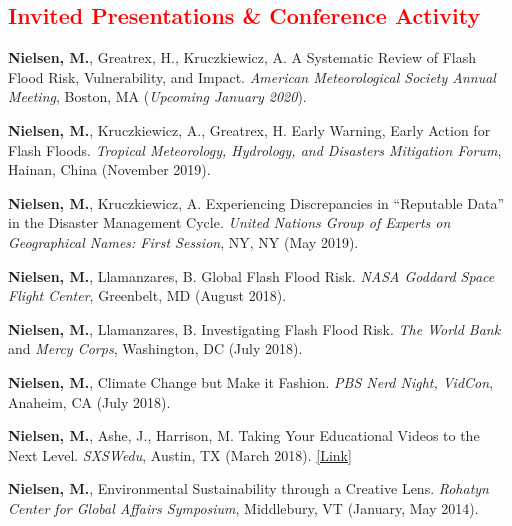 \documentclass[margin, line]{res}
\begin{document}
\begin{resume}
\section{\sc \textcolor{Red}{\large{Invited Presentations \& Conference Activity}}}
\begin{etaremune}[leftmargin=.2in,topsep=0in,parsep=0in]
\item \textbf{Nielsen, M.}, Greatrex, H., Kruczkiewicz, A. A Systematic Review of Flash Flood Risk, Vulnerability, and Impact. \textit{American Meteorological Society Annual Meeting}, Boston, MA (\textit{Upcoming January 2020}).
\item \textbf{Nielsen, M.},  Kruczkiewicz, A., Greatrex, H. Early Warning, Early Action for Flash Floods. \textit{Tropical Meteorology, Hydrology, and Disasters Mitigation Forum}, Hainan, China (November 2019).
\item \textbf{Nielsen, M.}, Kruczkiewicz, A.  Experiencing Discrepancies in “Reputable Data” in the Disaster Management Cycle. \textit{United Nations Group of Experts on Geographical Names: First Session}, NY, NY (May 2019). 
\item  \textbf{Nielsen, M.}, Llamanzares, B. Global Flash Flood Risk. \textit{NASA Goddard Space Flight Center}, Greenbelt, MD (August 2018). 
\item  \textbf{Nielsen, M.}, Llamanzares, B. Investigating Flash Flood Risk. \textit{The World Bank} and \textit{Mercy Corps}, Washington, DC (July 2018). 
\item  \textbf{Nielsen, M.}, Climate Change but Make it Fashion. \textit{PBS Nerd Night, VidCon}, Anaheim, CA (July 2018).
\item  \textbf{Nielsen, M.}, Ashe, J., Harrison, M. Taking Your Educational Videos to the Next Level. \textit{SXSWedu}, Austin, TX (March 2018). \href{https://schedule.sxswedu.com/2018/events/PP76461}{[Link]}
\item  \textbf{Nielsen, M.}, Environmental Sustainability through a Creative Lens. \textit{Rohatyn Center for Global Affairs Symposium}, Middlebury, VT (January, May 2014). 
\end{etaremune}



\fancyhf{}



\end{resume}
\end{document}
